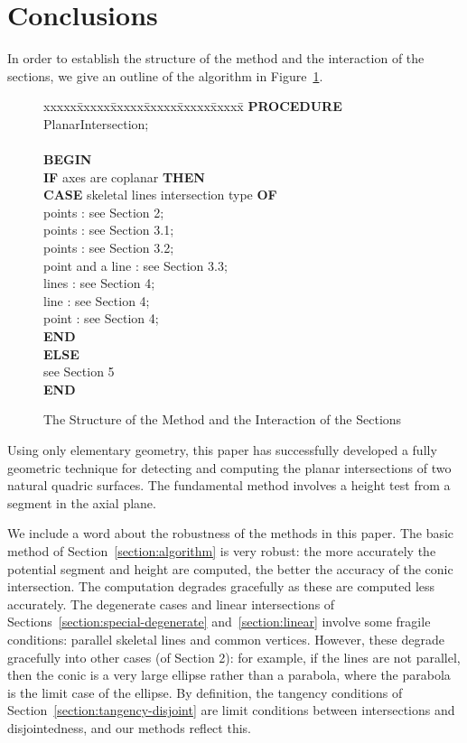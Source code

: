 \section{Conclusions}
\label{section:conclusion}
     In order to establish the structure of the method and the interaction
of the sections, we give an outline of the algorithm in Figure~\ref{fig:algo}.
\begin{figure}
{\small
\begin{tabbing}
     xxxxx\=xxxxx\=xxxxx\=xxxxx\=xxxxx\=xxxxx\=\kill
     {\bf PROCEDURE} PlanarIntersection; \\
     \\
     {\bf BEGIN} \\
     \> {\bf IF} axes are coplanar {\bf THEN} \\
     \>\> {\bf CASE} skeletal lines intersection type {\bf OF} \\
     \>\> points : see Section 2; \\
     \>\> points : see Section 3.1; \\
     \>\> points : see Section 3.2; \\
     \>\> point and a line : see Section 3.3; \\
     \>\> lines : see Section 4; \\
     \>\> line  : see Section 4; \\
     \>\> point : see Section 4; \\
     \>\> {\bf END} \\
     \> {\bf ELSE} \\
     \>\>  see Section 5 \\
     {\bf END} \\
\end{tabbing}
}
\caption{The Structure of the Method and the Interaction of the Sections}
\label{fig:algo}
\end{figure}

     Using only elementary geometry, this paper has successfully developed a 
fully geometric technique for detecting and computing the planar intersections
of two natural quadric surfaces.  The fundamental method involves a height
test from a segment in the axial plane.

     We include a word about the robustness of the methods in this paper.
The basic method of Section~\ref{section:algorithm} is very robust: the more 
accurately the potential segment and height are computed, the better the 
accuracy of the conic intersection.
The computation degrades gracefully as these are computed less accurately.
The degenerate cases and linear intersections of 
Sections~\ref{section:special-degenerate} and~\ref{section:linear} involve
some fragile conditions: parallel skeletal lines and common vertices.
However, these degrade gracefully into other cases (of Section 2): for example,
if the lines are not parallel, then the conic is a very large ellipse
rather than a parabola, where the parabola is the limit case of the ellipse.
By definition, the tangency conditions of 
Section~\ref{section:tangency-disjoint} are limit conditions
between intersections and disjointedness, and our methods reflect this.

